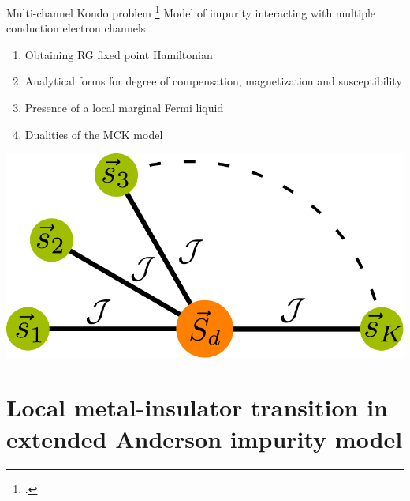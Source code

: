\documentclass[11pt,aspectratio=169]{beamer}
\begin{document}
\begin{frame}{Multi-channel Kondo problem}
\footcite{Noz_blandin_1980,Tsvelick_weigmann_mchannel_1985,affleck1993exact,Gan_mchannel_1994,affleck_1991_overscreen,emery_kivelson,bulla_1998}
Model of impurity interacting with multiple conduction electron channels \\[20pt]

\begin{minipage}{0.59\textwidth}
	\begin{enumerate}
		\item Obtaining RG fixed point Hamiltonian\\[20pt]
	\item Analytical forms for degree of compensation, magnetization and susceptibility\\[20pt]
	\item Presence of a local marginal Fermi liquid\\[20pt]
	\item Dualities of the MCK model
\end{enumerate}
\end{minipage}
\begin{minipage}{0.4\textwidth}
	\includegraphics[width=\textwidth]{stargraph.pdf}
\end{minipage}

\end{frame}

\section{Local metal-insulator transition in extended Anderson impurity model}
\end{document}
